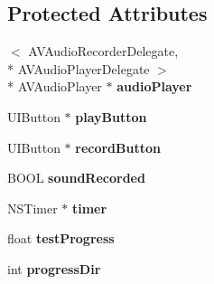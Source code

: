 \subsection*{Protected Attributes}
\begin{DoxyCompactItemize}
\item 
$<$ A\-V\-Audio\-Recorder\-Delegate, \\*
A\-V\-Audio\-Player\-Delegate $>$\\*
 A\-V\-Audio\-Player $\ast$ {\bfseries audio\-Player}
\item 
\hypertarget{interface_record_view_controller_a533a053cdbf3e2302b4a653cb1f1b5ec}{U\-I\-Button $\ast$ {\bfseries play\-Button}}\label{interface_record_view_controller_a533a053cdbf3e2302b4a653cb1f1b5ec}

\item 
\hypertarget{interface_record_view_controller_a30b7720f455ca964c12cc143b0472917}{U\-I\-Button $\ast$ {\bfseries record\-Button}}\label{interface_record_view_controller_a30b7720f455ca964c12cc143b0472917}

\item 
\hypertarget{interface_record_view_controller_a39258c62291e6b5a650e4296e6afc9bf}{B\-O\-O\-L {\bfseries sound\-Recorded}}\label{interface_record_view_controller_a39258c62291e6b5a650e4296e6afc9bf}

\item 
\hypertarget{interface_record_view_controller_ae643b4a1512ef55b11d36678d568030e}{N\-S\-Timer $\ast$ {\bfseries timer}}\label{interface_record_view_controller_ae643b4a1512ef55b11d36678d568030e}

\item 
\hypertarget{interface_record_view_controller_ac9c6a58b286bf0c5acd92a5cf6310f64}{float {\bfseries test\-Progress}}\label{interface_record_view_controller_ac9c6a58b286bf0c5acd92a5cf6310f64}

\item 
\hypertarget{interface_record_view_controller_a9f55072a0f5718e58b98b2d7f3c15533}{int {\bfseries progress\-Dir}}\label{interface_record_view_controller_a9f55072a0f5718e58b98b2d7f3c15533}

\end{DoxyCompactItemize}
